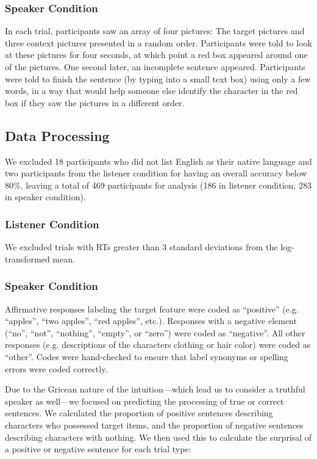 \documentclass[man]{apa2}
\begin{document}
\subsubsection{Speaker Condition}

In each trial, participants saw an array of four pictures: The target pictures and three context pictures presented in a random order.  Participants were told to look at these pictures for four seconds, at which point a red box appeared around one of the pictures.  One second later, an incomplete sentence appeared.  Participants were told to finish the sentence (by typing into a small text box) using only a few words, in a way that would help someone else identify the character in the red box if they saw the pictures in a different order.  

 
 \subsection{Data Processing} 
  
We excluded 18 participants who did not list English as their native language and two participants from the listener condition for having an overall accuracy below 80\%, leaving a total of 469 participants for analysis (186 in listener condition, 283 in speaker condition). 

\subsubsection{Listener Condition}
We excluded trials with RTs greater than 3 standard deviations from the log-transformed mean.  

\subsubsection{Speaker Condition}
Affirmative responses labeling the target feature were coded as ``positive'' (e.g. ``apples'', ``two apples'', ``red apples'', etc.).  Responses with a negative element (``no'', ``not'', ``nothing'', ``empty'', or ``zero'') were coded as ``negative''.  All other responses (e.g. descriptions of the characters clothing or hair color) were coded as ``other''.  Codes were hand-checked to ensure that label synonyms or spelling errors were coded correctly.  

Due to the Gricean nature of the intuition---which lead us to consider a truthful speaker as well---we focused on predicting the processing of true or correct sentences.   We calculated the proportion of positive sentences describing characters who possessed target items, and the proportion of negative sentences describing characters with nothing.  We then used this to calculate the surprisal of a positive or negative sentence for each trial type: 
\end{document}
